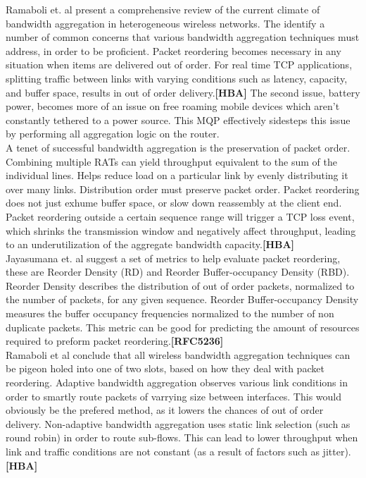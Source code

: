 \documentclass[12pt]{article}
\newcommand{\lcite}[1]
{{\bfseries\color{orange}[#1]}}
\begin{document}
	Ramaboli et. al present a comprehensive review of the current climate of bandwidth aggregation in heterogeneous wireless networks. The identify a number of common concerns that various bandwidth aggregation techniques must address, in order to be proficient. Packet reordering becomes necessary in any situation when items are delivered out of order. For real time TCP applications, splitting traffic between links with varying conditions such as latency, capacity, and buffer space, results in out of order delivery.\lcite{HBA} The second issue, battery power, becomes more of an issue on free roaming mobile devices which aren't constantly tethered to a power source. This MQP effectively sidesteps this issue by performing all aggregation logic on the router.\\

	A tenet of successful bandwidth aggregation is the preservation of packet order. Combining multiple RATs can yield throughput equivalent to the sum of the individual lines. Helps reduce load on a particular link by evenly distributing it over many links. Distribution order must preserve packet order. Packet reordering does not just exhume buffer space, or slow down reassembly at the client end. Packet reordering outside a certain sequence range will trigger a TCP loss event, which shrinks the transmission window and negatively affect throughput, leading to an underutilization of the aggregate bandwidth capacity.\lcite{HBA}\\

	Jayasumana et. al suggest a set of metrics to help evaluate packet reordering, these are Reorder Density (RD) and Reorder Buffer-occupancy Density (RBD). Reorder Density describes the distribution of out of order packets, normalized to the number of packets, for any given sequence. Reorder Buffer-occupancy Density measures the buffer occupancy frequencies normalized to the number of non duplicate packets. This metric can be good for predicting the amount of resources required to preform packet reordering.\lcite{RFC5236}\\

	Ramaboli et al conclude that all wireless bandwidth aggregation techniques can be pigeon holed into one of two slots, based on how they deal with packet reordering. Adaptive bandwidth aggregation observes various link conditions in order to smartly route packets of varrying size between interfaces. This would obviously be the prefered method, as it lowers the chances of out of order delivery. Non-adaptive bandwidth aggregation uses static link selection (such as round robin) in order to route sub-flows. This can lead to lower throughput when link and traffic conditions are not constant (as a result of factors such as jitter).\lcite{HBA}\\
\end{document}
